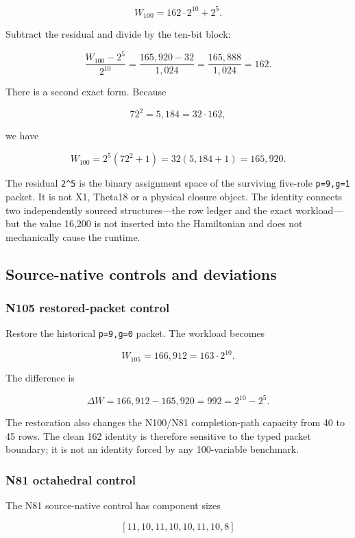 \[
W_{100}=162\cdot2^{10}+2^5.
\]

Subtract the residual and divide by the ten-bit block:

\[
\frac{W_{100}-2^5}{2^{10}}
=\frac{165{,}920-32}{1{,}024}
=\frac{165{,}888}{1{,}024}
=162.
\]

There is a second exact form. Because

\[
72^2=5{,}184=32\cdot162,
\]

we have

\[
W_{100}=2^5(72^2+1)=32(5{,}184+1)=165{,}920.
\]

The residual \texttt{2\^{}5} is the binary assignment space of the
surviving five-role \texttt{p=9,g=1} packet. It is not X1, Theta18 or a
physical closure object. The identity connects two independently sourced
structures---the row ledger and the exact workload---but the value
16,200 is not inserted into the Hamiltonian and does not mechanically
cause the runtime.

\subsection{Source-native controls and
deviations}\label{viii-ch01-source-native-controls-and-deviations}

\subsubsection{N105 restored-packet
control}\label{viii-ch01-n105-restored-packet-control}

Restore the historical \texttt{p=9,g=0} packet. The workload becomes

\[
W_{105}=166{,}912=163\cdot2^{10}.
\]

The difference is

\[
\Delta W=166{,}912-165{,}920=992=2^{10}-2^5.
\]

The restoration also changes the N100/N81 completion-path capacity from
40 to 45 rows. The clean 162 identity is therefore sensitive to the
typed packet boundary; it is not an identity forced by any 100-variable
benchmark.

\subsubsection{N81 octahedral control}\label{viii-ch01-n81-octahedral-control}

The N81 source-native control has component sizes

\[
[11,10,11,10,10,11,10,8]
\]

